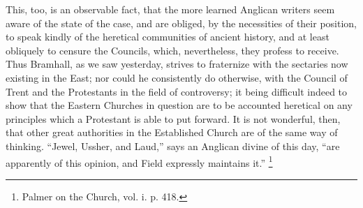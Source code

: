 This, too, is an observable fact, that the more learned Anglican
writers seem aware of the state of the case, and are obliged, by the
necessities of their position, to speak kindly of the heretical
communities of ancient history, and at least obliquely to censure the
Councils, which, nevertheless, they profess to receive. Thus Bramhall,
as we saw yesterday, strives to fraternize with the sectaries now
existing in the East; nor could he consistently do otherwise, with the
Council of Trent and the Protestants in the field of controversy; it
being difficult indeed to show that the Eastern Churches in question
are to be accounted heretical on any principles which a Protestant is
able to put forward. It is not wonderful, then, that other great
authorities in the Established Church are of the same way of thinking.
``Jewel, Ussher, and Laud,'' says an Anglican divine of this
day, ``are apparently of this opinion, and Field expressly
maintains it.'' \footnote{Palmer on the Church, vol. i. p. 418.}

